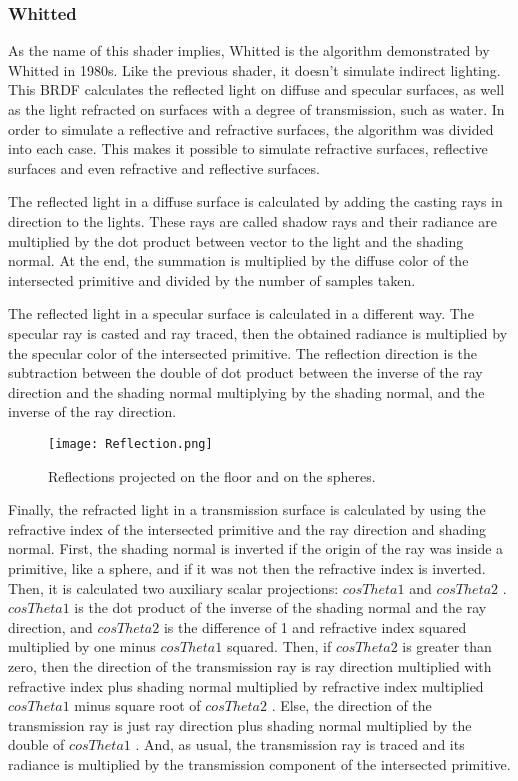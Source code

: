 \subsubsection{Whitted}

\par
As the name of this shader implies, Whitted is the algorithm demonstrated by Whitted in 1980s.
Like the previous shader, it doesn't simulate indirect lighting.
This BRDF calculates the reflected light on diffuse and specular surfaces, as well as the light refracted on surfaces with a degree of transmission, such as water.
In order to simulate a reflective and refractive surfaces, the algorithm was divided into each case.
This makes it possible to simulate refractive surfaces, reflective surfaces and even refractive and reflective surfaces.

\par
The reflected light in a diffuse surface is calculated by adding the casting rays in direction to the lights.
These rays are called shadow rays and their radiance are multiplied by the dot product between vector to the light and the shading normal.
At the end, the summation is multiplied by the diffuse color of the intersected primitive and divided by the number of samples taken.

\par
The reflected light in a specular surface is calculated in a different way.
The specular ray is casted and ray traced, then the obtained radiance is multiplied by the specular color of the intersected primitive.
The reflection direction is the subtraction between the double of dot product between the inverse of the ray direction and the shading normal multiplying by the shading normal, and the inverse of the ray direction.

\begin{figure}[H]
	\centering
	\caption{Reflections projected on the floor and on the spheres.}
	\label{Reflection.}
	\texttt{[image: Reflection.png]}
\end{figure}

\par
Finally, the refracted light in a transmission surface is calculated by using the refractive index of the intersected primitive and the ray direction and shading normal.
First, the shading normal is inverted if the origin of the ray was inside a primitive, like a sphere, and if it was not then the refractive index is inverted.
Then, it is calculated two auxiliary scalar projections:
$cosTheta1$
and
$cosTheta2$
.
$cosTheta1$
is the dot product of the inverse of the shading normal and the ray direction, and
$cosTheta2$
is the difference of 1 and refractive index squared multiplied by one minus
$cosTheta1$
squared.
Then, if
$cosTheta2$
is greater than zero, then the direction of the transmission ray is ray direction multiplied with refractive index plus shading normal multiplied by refractive index multiplied $cosTheta1$
minus square root of 
$cosTheta2$
.
Else, the direction of the transmission ray is just ray direction plus shading normal multiplied by the double of
$cosTheta1$
.
And, as usual, the transmission ray is traced and its radiance is multiplied by the transmission component of the intersected primitive.

